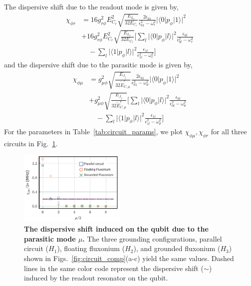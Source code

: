 \documentclass[%
reprint,
superscriptaddress,
 amsmath,amssymb,
 aps,
 prx,
longbibliography,
floatfix,
]{revtex4-2}
\begin{document}
{The dispersive shift due to the readout mode is given by,
\begin{align}
\chi_{\phi r}&=16g_{r\phi}^2E_{C_r}^2\sqrt{\frac{E_{L_r}}{32E_{C_r}}}\frac{2\epsilon_{01}}{\epsilon_{01}^2-\omega_r^2}|\langle 0|p_\phi|1 \rangle|^2\nonumber\\
   &+16g_{r\phi}^2E_{C_r}^2\sqrt{\frac{E_{L_r}}{32E_{C_r}}}\Bigg[\sum_l|\langle 0|p_\phi|l \rangle|^2\frac{\epsilon_{0l}}{\epsilon_{0l}^2-\omega_r^2}\nonumber\\&\quad-\sum_l|\langle 1|p_\phi|l \rangle|^2\frac{\epsilon_{1l}}{\epsilon_{1l}^2-\omega_r^2}\Bigg]
\end{align}
and the dispersive shift due to the parasitic mode is given by,
\begin{align}  
   \chi_{\phi\mu}&=g_{\mu\phi}^2\sqrt{\frac{E_{J_j}}{32\tilde{E}_{C,\mu}^e}}\frac{2\epsilon_{01}}{\epsilon_{01}^2-\omega_\mu^2}|\langle 0|p_\phi|1 \rangle|^2\nonumber\\
   &+g_{\mu\phi}^2\sqrt{\frac{E_{J_j}}{32\tilde{E}_{C,\mu}^e}}\Bigg[\sum_l|\langle 0|p_\phi|l \rangle|^2\frac{\epsilon_{0l}}{\epsilon_{0l}^2-\omega_\mu^2}\nonumber\\&\quad-\sum_l|\langle 1|p_\phi|l \rangle|^2\frac{\epsilon_{1l}}{\epsilon_{1l}^2-\omega_\mu^2}\Bigg]
\end{align}
}
For the parameters in Table~\ref{tab:circuit_params},  we plot $\chi_{\phi\mu},\chi_{\phi r}$ for all three circuits in Fig.~\ref{fig:dispersive-shift}. 
\begin{figure}[htb]
    \centering
    \includegraphics[width=0.45\textwidth]{Supp_Fig/dispersive_shift.pdf}
    \caption{ {\bf The dispersive shift induced on the qubit due to the parasitic mode $\mu$.} The three grounding configurations, parallel circuit ($H_1$), floating fluxonium ($H_2$), and grounded fluxonium ($H_3$) shown in Figs.~\ref{fig:circuit_comp}(a-c) yield the same values. Dashed lines in the same color code represent the dispersive shift ($\sim $) induced by the readout resonator on the qubit.}
    \label{fig:dispersive-shift}
\end{figure}
\end{document}
